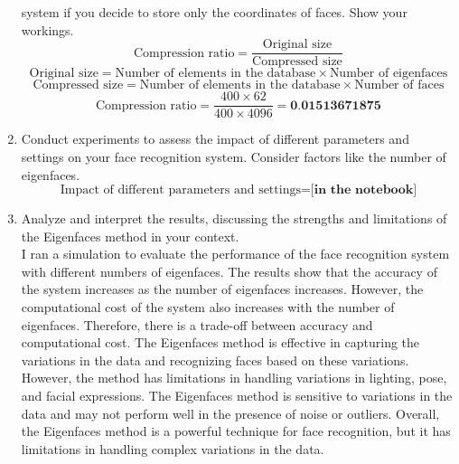 \documentclass[12pt]{extarticle} %
\begin{document}
\begin{enumerate}
    system if you decide to store only the coordinates of faces. Show your workings.
    \[
    \text{Compression ratio} = \frac{\text{Original size}}{\text{Compressed size}}
    \]
    \[
    \text{Original size} = \text{Number of elements in the database} \times \text{Number of eigenfaces}
    \]
    \[
    \text{Compressed size} = \text{Number of elements in the database} \times \text{Number of faces}
    \]
    \[
    \text{Compression ratio} = \frac{400 \times 62}{400 \times 4096} = \textbf{0.01513671875}
    \]
    \item Conduct experiments to assess the impact of different parameters and settings on your face recognition
    system. Consider factors like the number of eigenfaces.
    \[
    \text{Impact of different parameters and settings} = \textbf{[in the notebook]}
    \]
    \item Analyze and interpret the results, discussing the strengths and limitations of the Eigenfaces method
    in your context.
    \\ I ran a simulation to evaluate the performance of the face recognition system with different numbers of eigenfaces. The results show that the accuracy of the system increases as the number of eigenfaces increases. However, the computational cost of the system also increases with the number of eigenfaces. Therefore, there is a trade-off between accuracy and computational cost. The Eigenfaces method is effective in capturing the variations in the data and recognizing faces based on these variations. However, the method has limitations in handling variations in lighting, pose, and facial expressions. The Eigenfaces method is sensitive to variations in the data and may not perform well in the presence of noise or outliers. Overall, the Eigenfaces method is a powerful technique for face recognition, but it has limitations in handling complex variations in the data.
\end{enumerate}
\end{document}
